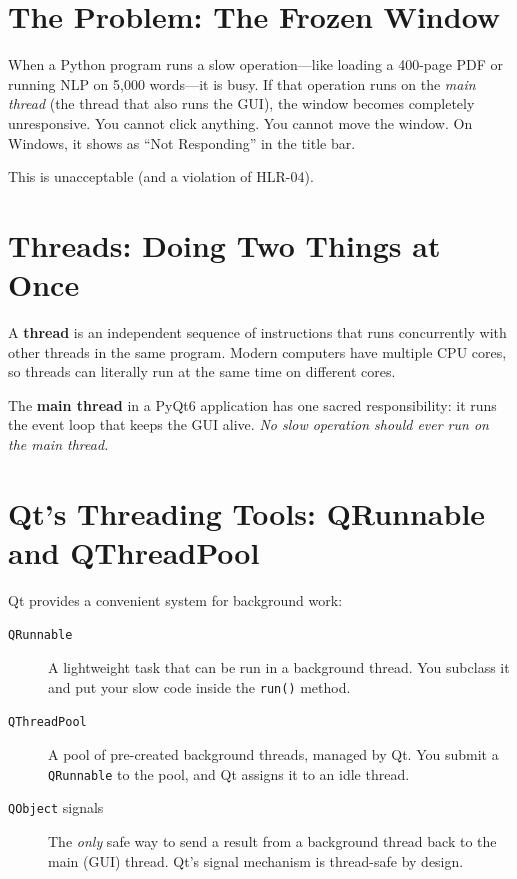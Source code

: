 \documentclass[12pt,oneside]{book}
\begin{document}
\section{The Problem: The Frozen Window}

When a Python program runs a slow operation—like loading a 400-page PDF or running
NLP on 5,000 words—it is busy. If that operation runs on the \textit{main thread}
(the thread that also runs the GUI), the window becomes completely unresponsive. You
cannot click anything. You cannot move the window. On Windows, it shows as ``Not
Responding'' in the title bar.

This is unacceptable (and a violation of HLR-04).

\section{Threads: Doing Two Things at Once}

A \textbf{thread} is an independent sequence of instructions that runs concurrently with
other threads in the same program. Modern computers have multiple CPU cores, so threads
can literally run at the same time on different cores.

The \textbf{main thread} in a PyQt6 application has one sacred responsibility: it runs
the event loop that keeps the GUI alive. \textit{No slow operation should ever run on the
main thread.}

\section{Qt's Threading Tools: QRunnable and QThreadPool}

Qt provides a convenient system for background work:

\begin{description}
  \item[\texttt{QRunnable}] A lightweight task that can be run in a background thread.
    You subclass it and put your slow code inside the \texttt{run()} method.
  \item[\texttt{QThreadPool}] A pool of pre-created background threads, managed by Qt.
    You submit a \texttt{QRunnable} to the pool, and Qt assigns it to an idle thread.
  \item[\texttt{QObject} signals] The \textit{only} safe way to send a result from a
    background thread back to the main (GUI) thread. Qt's signal mechanism is
    thread-safe by design.
\end{description}
\end{document}
